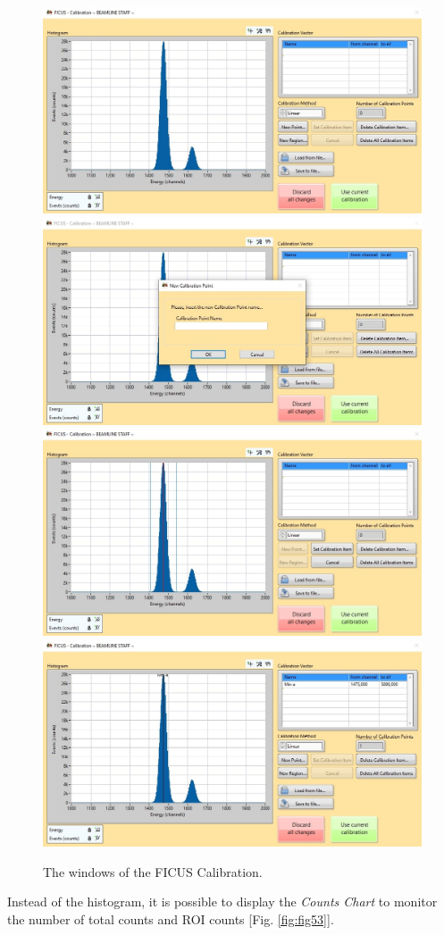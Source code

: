\documentclass[a4paper,12pt,oneside,pdflatex,italian,final,twocolumn]{article}
\begin{document}
\begin{figure}[h!]
\centering
\subfloat
{\includegraphics[width=.48\textwidth]{Cattura92.jpg}} \quad
\subfloat
{\includegraphics[width=.48\textwidth]{Cattura93.jpg}} \\
\subfloat
{\includegraphics[width=.48\textwidth]{Cattura94.jpg}} \quad
\subfloat
{\includegraphics[width=.48\textwidth]{Cattura95.jpg}} \\
\caption{The windows of the FICUS Calibration.}\label{fig:fig52}
\end{figure}

Instead of the histogram, it is possible to display the \textit{Counts Chart} to monitor the number of total counts and ROI counts [Fig. \ref{fig:fig53}].
\end{document}
